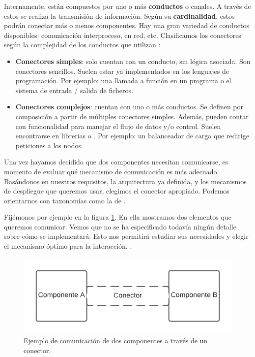 Internamente, están compuestos por uno o más \textbf{conductos} o canales. A través de estos se realiza la transmisión de información. Según su \textbf{cardinalidad}, estos podrán conectar más o menos componentes. Hay una gran variedad de conductos disponibles: comunicación interproceso, en red, etc. Clasificamos los conectores según la complejidad de los conductos que utilizan \cite{mehtaTaxonomySoftwareConnectors2000}:

\begin{itemize}
    \item \textbf{Conectores simples}: solo cuentan con un conducto, sin lógica asociada. Son conectores sencillos. Suelen estar ya implementados en los lenguajes de programación. Por ejemplo: una llamada a función en un programa o el sistema de entrada / salida de ficheros.

    \item \textbf{Conectores complejos}: cuentan con uno o más conductos. Se definen por composición a partir de múltiples conectores simples. Además, pueden contar con funcionalidad para manejar el flujo de datos y/o control. Suelen encontrarse en librerias o . Por ejemplo: un balanceador de carga que redirige peticiones a los nodos.
\end{itemize}

Una vez hayamos decidido que dos componentes necesitan comunicarse, es momento de evaluar qué mecanismo de comunicación es más adecuado. Basándonos en nuestros requisitos, la arquitectura ya definida, y los mecanismos de despliegue que queremos usar, elegimos el conector apropiado. Podemos orientarnos con taxonomías como la de \cite{mehtaTaxonomySoftwareConnectors2000}.

Fijémonos por ejemplo en la figura \ref{fig:componentesYConectorEjemplo}. En ella mostramos dos elementos que queremos comunicar. Vemos que no se ha especificado todavía ningún detalle sobre cómo se implementará. Esto nos permitirá estudiar sus necesidades y elegir el mecanismo óptimo para la interacción. \cite{taylorSoftwareArchitectureFoundations2009}.

\begin{figure}[h!]
  \centering
  \includegraphics[scale=0.78]{cap_contexto_tecnologico/images/conector}
  \caption{Ejemplo de comunicación de dos componentes a través de un conector.}
  \label{fig:componentesYConectorEjemplo}
\end{figure}

